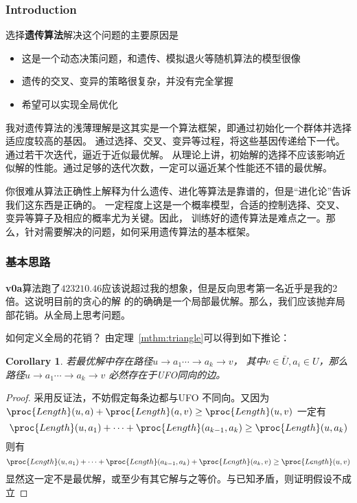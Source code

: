 \documentclass[hyperref,UTF8]{ctexart}
\newtheorem{cor}[thm]{Corollary}
\theoremstyle{definition}
\theoremstyle{remark}
\numberwithin{equation}{subsection}
\newcommand{\Emph}{\textbf}
\begin{document}
\subsubsection{Introduction}

	选择\Emph{遗传算法}解决这个问题的主要原因是
	\begin{itemize}
		
		\item 这是一个动态决策问题，和遗传、模拟退火等随机算法的模型很像
		
		\item 遗传的交叉、变异的策略很复杂，并没有完全掌握
		
		\item 希望可以实现全局优化
		
	\end{itemize}
	
	我对遗传算法的浅薄理解是这其实是一个算法框架，即通过初始化一个群体并选择适应度较高的基因。
	通过选择、交叉、变异等过程，将这些基因传递给下一代。通过若干次迭代，逼近于近似最优解。
	从理论上讲，初始解的选择不应该影响近似解的性能。通过足够的迭代次数，一定可以逼近某个性能还不错的最优解。
	
	你很难从算法正确性上解释为什么遗传、进化等算法是靠谱的，但是“进化论”告诉我们这东西是正确的。
	一定程度上这是一个概率模型，合适的控制选择、交叉、变异等算子及相应的概率尤为关键。因此，
	训练好的遗传算法是难点之一。那么，针对需要解决的问题，如何采用遗传算法的基本框架。
	
	
\subsubsection{基本思路}
	
	\Emph{v0a}算法跑了$423210.46$应该说超过我的想象，但是反向思考第一名近乎是我的2 倍。这说明目前的贪心的解
	的的确确是一个局部最优解。那么，我们应该抛弃局部花销。从全局上思考问题。
	
	如何定义全局的花销？
	由定理~\ref{mthm:triangle}可以得到如下推论：
	\begin{cor}
		若最优解中存在路径$u \rightarrow a_1 \cdots \rightarrow a_k \rightarrow v$，
		其中$v \in \bar{U}, a_i \in U$，那么路径$u \rightarrow a_1 \cdots \rightarrow a_k \rightarrow v$
		必然存在于UFO同向的边。
	\end{cor}
	\begin{proof}
		采用反证法，不妨假定每条边都与UFO 不同向。又因为$\proc{Length}(u, a) + \proc{Length}(a, v) \ge \proc{Length}(u, v)$
		一定有
		\[
			\proc{Length}(u, a_1) + \cdots + \proc{Length}(a_{k-1}, a_k) \ge \proc{Length}(u, a_k)
		\]
		则有
		\[
			\proc{Length}(u, a_1) + \cdots + \proc{Length}(a_{k-1}, a_k) + \proc{Length}(a_k, v)
			\ge \proc{Length}(u, v)
		\]
		显然这一定不是最优解，或至少有其它解与之等价。与已知矛盾，则证明假设不成立
	\end{proof}
	
\end{document}
